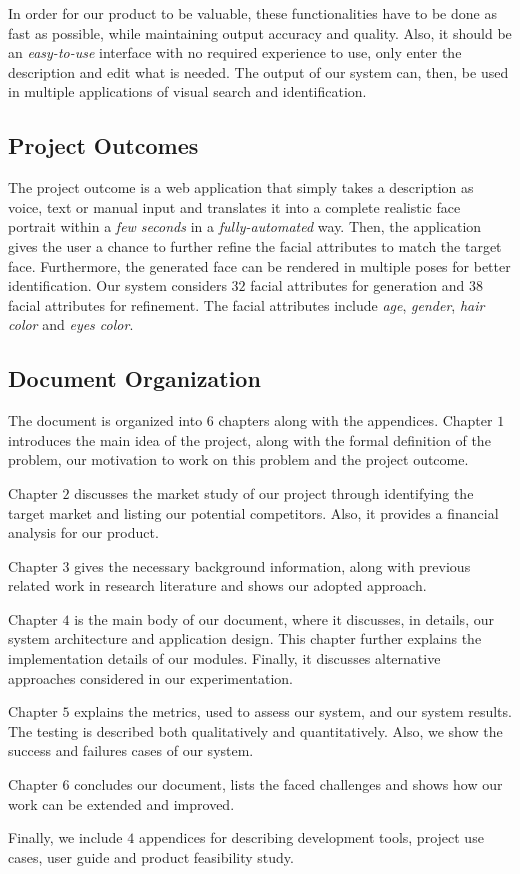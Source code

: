 In order for our product to be valuable, these functionalities have to be done as fast as possible, while maintaining output accuracy and quality. Also, it should be an \emph{easy-to-use} interface with no required experience to use, only enter the description and edit what is needed. The output of our system can, then, be used in multiple applications of visual search and identification.

\subsection{Project Outcomes}
The project outcome is a web application that simply takes a description as voice, text or manual input and translates it into a complete realistic face portrait within a \emph{few seconds} in a \emph{fully-automated} way. Then, the application gives the user a chance to further refine the facial attributes to match the target face. Furthermore, the generated face can be rendered in multiple poses for better identification. Our system considers $32$ facial attributes for generation and $38$ facial attributes for refinement. The facial attributes include \emph{age}, \emph{gender}, \emph{hair color} and \emph{eyes color}. 

\subsection{Document Organization}
The document is organized into $6$ chapters along with the appendices. Chapter $1$ introduces the main idea of the project, along with the formal definition of the problem, our motivation to work on this problem and the project outcome.

Chapter $2$ discusses the market study of our project through identifying the target market and listing our potential competitors. Also, it provides a financial analysis for our product.

Chapter $3$ gives the necessary background information, along with previous related work in research literature and shows our adopted approach.

Chapter $4$ is the main body of our document, where it discusses, in details, our system architecture and application design. This chapter further explains the implementation details of our modules. Finally, it discusses alternative approaches considered in our experimentation.

Chapter $5$ explains the metrics, used to assess our system, and our system results. The testing is described both qualitatively and quantitatively. Also, we show the success and failures cases of our system.

Chapter $6$ concludes our document, lists the faced challenges and shows how our work can be extended and improved.

Finally, we include $4$ appendices for describing development tools, project use cases, user guide and product feasibility study.
